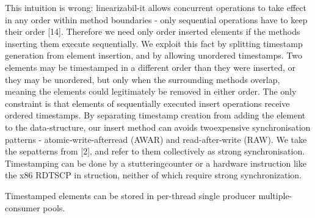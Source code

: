 This intuition is wrong: linearizabil-it allows concurrent operations to take
effect in any order within method boundaries - only sequential operations have
to keep their order [14]. 
Therefore we need only order inserted elements if the methods inserting them
execute sequentially. 
We exploit this fact by splitting timestamp generation from element insertion,
and by allowing unordered timestamps. 
Two elements may be timestamped in a different order than they were inserted,
or they may be unordered, but only when the surrounding methods overlap, meaning
the elements could legitimately be removed in either order.
The only constraint is that elements of sequentially executed insert operations
receive ordered timestamps.
By separating timestamp creation from adding the element to the data-structure,
our insert method can avoids twoexpensive synchronisation patterns -
atomic-write-afterread (AWAR) and read-after-write (RAW). 
We take the sepatterns from [2], and refer to them collectively as strong
synchronisation. 
Timestamping can be done by a stutteringcounter or a hardware instruction like
the x86 RDTSCP in struction, neither of which require strong synchronization.

Timestamped elements can be stored in per-thread single producer
multiple-consumer pools.


